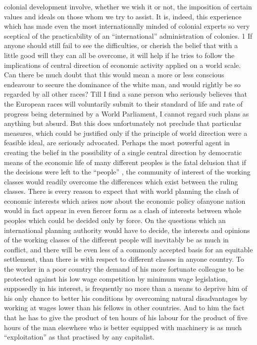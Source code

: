 \documentclass[11pt,openany]{book}
\begin{document}
colonial development involve, whether we wish it or not, the imposition of certain values and ideals on those whom we try to assist. It is, indeed, this experience which has made even the most internationally minded of colonial experts so very sceptical of the practicability of an ``international'' administration of colonies. 1 If anyone should still fail to see the difficulties, or cherish the belief that with a little good will they can all be overcome, it will help if he tries to follow the implications of central direction of economic activity applied on a world scale. Can there be much doubt that this would mean a more or less conscious endeavour to secure the dominance of the white man, and would rightly be so regarded by all other races? Till I find a sane person who seriously believes that the European races will voluntarily submit to their standard of life and rate of progress being determined by a World Parliament, I cannot regard such plans as anything but absurd. But this does unfortunately not preclude that particular measures, which could be justified only if the principle of world direction were a feasible ideal, are seriously advocated. Perhaps the most powerful agent in creating the belief in the possibility of a single central direction by democratic means of the economic life of many different peoples is the fatal delusion that if the decisions were left to the ``people'' , the community of interest of the working classes would readily overcome the differences which exist between the ruling classes. There is every reason to expect that with world planning the clash of economic interests which arises now about the economic policy ofanyone nation would in fact appear in even fiercer form as a clash of interests between whole peoples which could be decided only by force. On the questions which an international planning authority would have to decide, the interests and opinions of the working classes of the different people will inevitably be as much in conflict, and there will be even less of a commonly accepted basis for an equitable settlement, than there is with respect to different classes in anyone country. To the worker in a poor country the demand of his more fortunate colleague to be protected against his low wage competition by minimum wage legislation, supposedly in his interest, is frequently no more than a means to deprive him of his only chance to better his conditions by overcoming natural disadvantages by working at wages lower than his fellows in other countries. And to him the fact that he has to give the product of ten hours of his labour for the product of five hours of the man elsewhere who is better equipped with machinery is as much ``exploitation'' as that practised by any capitalist.
\end{document}

